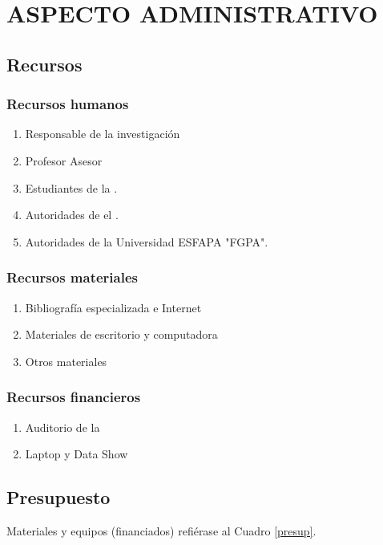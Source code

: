 \documentclass[12pt,a4paper]{article}
\begin{document}


\section{ASPECTO  ADMINISTRATIVO}
\subsection{Recursos}

\subsubsection{Recursos humanos}
\begin{enumerate}
	\item Responsable de la investigación
	\item Profesor Asesor
	\item Estudiantes de la \lugar.
	\item Autoridades de el \lugar.
	\item Autoridades de la Universidad ESFAPA "FGPA".
\end{enumerate}

\subsubsection{Recursos materiales}
\begin{enumerate}
	\item Bibliografía especializada e Internet %
	\item Materiales de escritorio y computadora %
	\item Otros materiales %
\end{enumerate}

\subsubsection{Recursos financieros}
\begin{enumerate}
	\item Auditorio de la \lugar
	\item Laptop y Data Show
\end{enumerate}

\subsection{Presupuesto}
Materiales y equipos (financiados) refiérase al Cuadro \ref{presup}.
\end{document}
